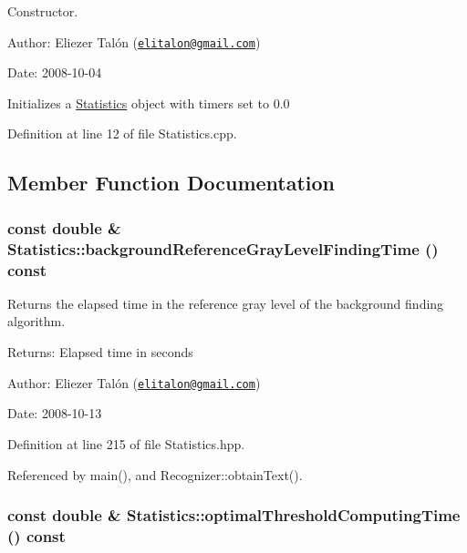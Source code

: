 Constructor. 

\begin{Desc}
\item[Author:]Eliezer Talón (\href{mailto:elitalon@gmail.com}{\tt elitalon@gmail.com}) \end{Desc}
\begin{Desc}
\item[Date:]2008-10-04\end{Desc}
Initializes a \hyperlink{class_statistics}{Statistics} object with timers set to 0.0 

Definition at line 12 of file Statistics.cpp.

\subsection{Member Function Documentation}
\hypertarget{class_statistics_d70a464a72d94c795097608e2a18550a}{
\subsubsection[backgroundReferenceGrayLevelFindingTime]{\setlength{\rightskip}{0pt plus 5cm}const double \& Statistics::backgroundReferenceGrayLevelFindingTime () const}}
\label{class_statistics_d70a464a72d94c795097608e2a18550a}


Returns the elapsed time in the reference gray level of the background finding algorithm. 

\begin{Desc}
\item[Returns:]Elapsed time in seconds\end{Desc}
\begin{Desc}
\item[Author:]Eliezer Talón (\href{mailto:elitalon@gmail.com}{\tt elitalon@gmail.com}) \end{Desc}
\begin{Desc}
\item[Date:]2008-10-13 \end{Desc}


Definition at line 215 of file Statistics.hpp.

Referenced by main(), and Recognizer::obtainText().\hypertarget{class_statistics_87bdb5b4f7a88cb74d0072fd0c7a2248}{
\subsubsection[optimalThresholdComputingTime]{\setlength{\rightskip}{0pt plus 5cm}const double \& Statistics::optimalThresholdComputingTime () const}}
\label{class_statistics_87bdb5b4f7a88cb74d0072fd0c7a2248}


